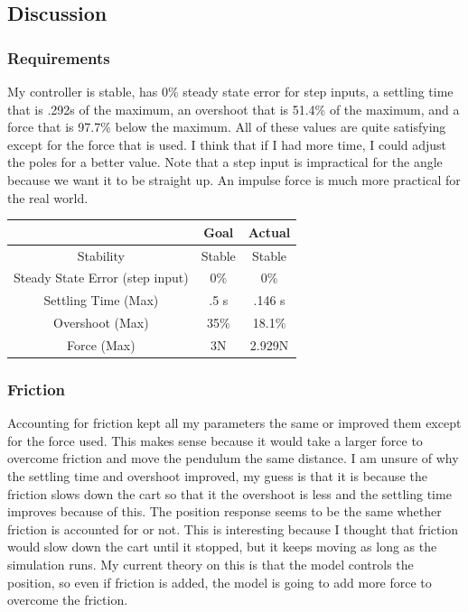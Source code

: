 \documentclass{article}
\begin{document}
\FloatBarrier

\subsection{Discussion}

\subsubsection{Requirements}

My controller is stable, has 0\% steady state error for step inputs, a settling time that is .292s of the maximum, an overshoot that is 51.4\% of the maximum, and a force that is 97.7\% below the maximum. All of these values are quite satisfying except for the force that is used. I think that if I had more time, I could adjust the poles for a better value. Note that a step input is impractical for the angle because we want it to be straight up. An impulse force is much more practical for the real world.

\begin{center}
\begin{tabular}{|c | c | c|} 
\hline
 & Goal & Actual \\ 
\hline
Stability &  Stable & Stable \\ 
\hline
Steady State Error (step input)  & 0\% & 0\% \\ 
\hline
Settling Time (Max) & .5 s & .146 s \\
\hline
Overshoot (Max)& 35\% & 18.1\% \\
\hline
Force (Max) & 3N & 2.929N \\
\hline
\end{tabular}
\end{center}

\subsubsection{Friction}

Accounting for friction kept all my parameters the same or improved them except for the force used. This makes sense because it would take a larger force to overcome friction and move the pendulum the same distance. I am unsure of why the settling time and overshoot improved, my guess is that it is because the friction slows down the cart so that it the overshoot is less and the settling time improves because of this. The position response seems to be the same whether friction is accounted for or not. This is interesting because I thought that friction would slow down the cart until it stopped, but it keeps moving as long as the simulation runs. My current theory on this is that the model controls the position, so even if friction is added, the model is going to add more force to overcome the friction.
\end{document}
